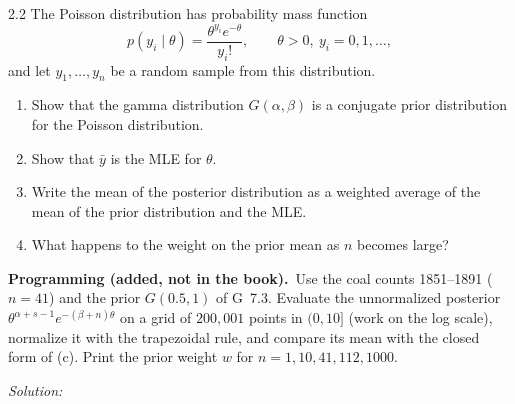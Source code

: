 \documentclass[11pt,a4paper]{article}
\newif\ifsolucoes
\newcommand{\espacoresol}{4.5cm}   %
\numberwithin{equation}{questao}   %
\newcommand{\programacao}{\par\smallskip\noindent\textbf{Programming (added, not in the book).}~}
\newcommand{\resolespaco}{\ifsolucoes\else\par\textit{Solution:}\vspace{\espacoresol}\par\fi}
\newcommand{\1}{\mathbf{1}}
\begin{document}
2.2 The Poisson distribution has probability mass function
\[ p(y_i\mid\theta)=\frac{\theta^{y_i}e^{-\theta}}{y_i!},\qquad \theta>0,\ y_i=0,1,\dots, \]
and let $y_1,\dots,y_n$ be a random sample from this distribution.
\begin{enumerate}[label=\textbf{(\alph*)},leftmargin=2.4em]
\item Show that the gamma distribution $G(\alpha,\beta)$ is a conjugate prior distribution for the
Poisson distribution.
\item Show that $\bar y$ is the MLE for $\theta$.
\item Write the mean of the posterior distribution as a weighted average of the mean of the prior
distribution and the MLE.
\item What happens to the weight on the prior mean as $n$ becomes large?
\end{enumerate}
\programacao Use the coal counts 1851--1891 ($n=41$) and the prior $G(0.5,1)$ of G~7.3. Evaluate
the unnormalized posterior $\theta^{\alpha+s-1}e^{-(\beta+n)\theta}$ on a grid of $200{,}001$ points in
$(0,10]$ (work on the log scale), normalize it with the trapezoidal rule, and compare its mean with
the closed form of (c). Print the prior weight $w$ for $n=1,10,41,112,1000$.
\resolespaco
\end{document}
